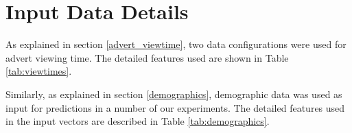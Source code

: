 \documentclass[review]{elsarticle}
\begin{document}


\clearpage
\appendix
\appendixpage

\section{Input Data Details}
\label{appendix:inputs}

As explained in section \ref{advert_viewtime}, two data configurations were used for advert viewing time. The detailed features used are shown in Table \ref{tab:viewtimes}. 

Similarly, as explained in section \ref{demographics}, demographic data was used as input for predictions in a number of our experiments. The detailed features used in the input vectors are described in Table \ref{tab:demographics}.
\end{document}
